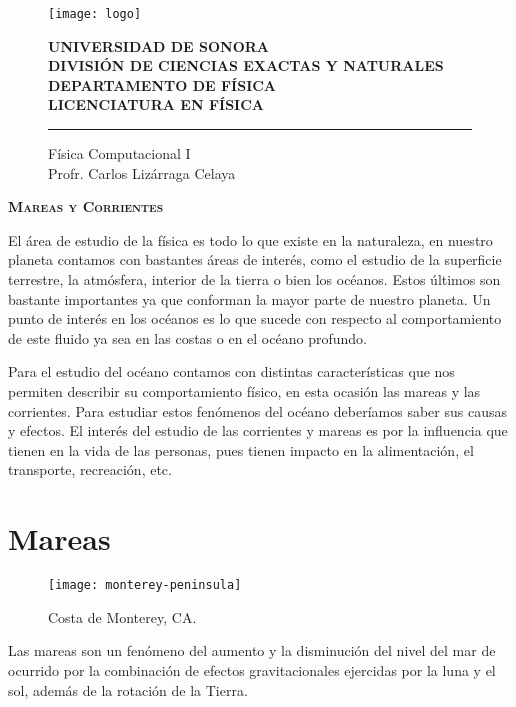 
\date{12 de Abril del 2017}


\begin{titlepage}

    \begin{figure}[ht!]
    \centering
    \texttt{[image: logo]}
    
    \textbf{UNIVERSIDAD DE SONORA \\ DIVISIÓN DE CIENCIAS EXACTAS Y NATURALES \\ DEPARTAMENTO DE FÍSICA \\ LICENCIATURA EN FÍSICA}
	\maketitle
    \hrule \bigskip
    \large{Física Computacional I}\\
	Profr. Carlos Lizárraga Celaya
    \end{figure}
\thispagestyle{empty}


\end{titlepage}

\newpage

\begin{center}
\huge{\textbf{\textsc{Mareas y Corrientes}}}
\end{center}

El área de estudio de la física es todo lo que existe en la naturaleza, en nuestro planeta contamos con bastantes áreas de interés, como el estudio de la superficie terrestre, la atmósfera, interior de la tierra o bien los océanos. Estos últimos son bastante importantes ya que conforman la mayor parte de nuestro planeta. Un punto de interés en los océanos es lo que sucede con respecto al comportamiento de este fluido ya sea en las costas o en el océano profundo.

Para el estudio del océano contamos con distintas características que nos permiten describir su comportamiento físico, en esta ocasión las mareas y las corrientes. Para estudiar estos fenómenos del océano deberíamos saber sus causas y efectos. El interés del estudio de las corrientes y mareas es por la influencia que tienen en la vida de las personas, pues tienen impacto en la alimentación, el transporte, recreación, etc.

\section{Mareas}

\begin{wrapfigure}{r}{0.5\textwidth}
  \begin{center}
    \texttt{[image: monterey-peninsula]}
  \end{center}
  \caption{Costa de Monterey, CA.}
\end{wrapfigure}
Las mareas son un fenómeno del aumento y la disminución del nivel del mar de ocurrido por la combinación de efectos gravitacionales ejercidas por la luna y el sol, además de la rotación de la Tierra. 

